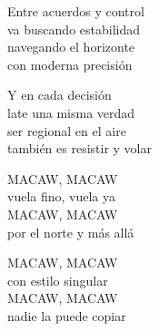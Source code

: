 \begin{lyrics}
Entre acuerdos y control\\
va buscando estabilidad\\
navegando el horizonte\\
con moderna precisión

Y en cada decisión\\
late una misma verdad\\
ser regional en el aire\\
también es resistir y volar

MACAW, MACAW\\
vuela fino, vuela ya\\
MACAW, MACAW\\
por el norte y más allá

MACAW, MACAW\\
con estilo singular\\
MACAW, MACAW\\
nadie la puede copiar
\end{lyrics}

